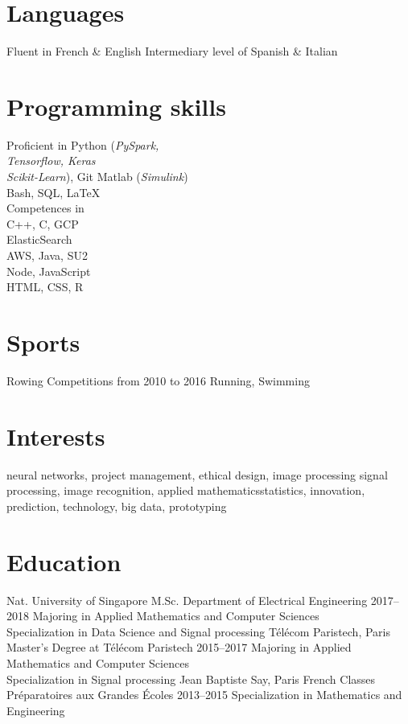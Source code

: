 \documentclass[]{source}
\begin{document}
\begin{aside}
\section{Languages}
    \medskip  Fluent in
    French \& English
    Intermediary level of
    Spanish \& Italian 
\vspace{0.3cm}
\section{Programming skills}
  \medskip Proficient in
  Python (\textit{PySpark, \\Tensorflow, Keras\\
   Scikit-Learn}), Git
  Matlab (\textit{Simulink}) \\
  Bash, SQL, \LaTeX\\
   Competences in \\
  C++, C, GCP\\
  ElasticSearch\\
  AWS, Java, SU2\\  
  Node, JavaScript\\
  HTML, CSS, R\\
\vspace{0.3cm}
\section{Sports}
  \medskip  Rowing Competitions 
  from 2010 to 2016
  Running, Swimming
\end{aside}

\section{Interests}

neural networks, project management, ethical design, image processing\newline
signal processing, image recognition, applied mathematics\newline statistics, innovation, prediction, technology, big data, prototyping

\bigskip

\section{Education}

\begin{entrylist}
\bigskip
  \entry
  	{\footnotesize{Nat. University of Singapore}}
    {M.Sc. Department of Electrical Engineering}
    {2017–2018}
    {Majoring in Applied Mathematics and Computer Sciences\\
    Specialization in Data Science and Signal processing }
\bigskip
  \entry
  	{\footnotesize{Télécom Paristech, Paris}}
    {Master's Degree at Télécom Paristech}
    {2015–2017}
    {Majoring in Applied Mathematics and Computer Sciences\\
Specialization in Signal processing}
  \entry
    {\footnotesize{Jean Baptiste Say, Paris}}
    {French Classes Préparatoires aux Grandes Écoles}
    {2013–2015}
    {Specialization in Mathematics and Engineering }
\end{entrylist}
\end{document}
